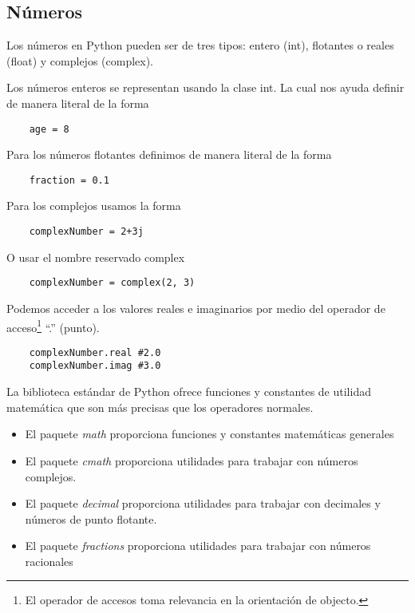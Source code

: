 \documentclass[12pt]{article}
\theoremstyle{definition}
\begin{document}
    \subsection{Números}
    Los números en Python pueden ser de tres tipos: entero (int), flotantes o reales (float) y complejos (complex).

    Los números enteros se representan usando la clase int.
    La cual nos ayuda definir de manera literal de la forma
    \begin{lstlisting}
    age = 8
    \end{lstlisting}

    Para los números flotantes definimos de manera literal de la forma
    \begin{lstlisting}
    fraction = 0.1
    \end{lstlisting}

    Para los complejos usamos la forma
    \begin{lstlisting}
    complexNumber = 2+3j
    \end{lstlisting}

    O usar el nombre reservado complex
    \begin{lstlisting}
    complexNumber = complex(2, 3)
    \end{lstlisting}
    Podemos acceder a los valores reales e imaginarios por medio del operador de acceso\footnote{El operador de accesos toma relevancia en la orientación de objecto.} ``.'' (punto).
    \begin{lstlisting}
    complexNumber.real #2.0
    complexNumber.imag #3.0
    \end{lstlisting}

    La biblioteca estándar de Python ofrece funciones y constantes de utilidad matemática que son más precisas que los operadores normales.
    \begin{itemize}
        \item El paquete \textit{math} proporciona funciones y constantes matemáticas generales
        \item El paquete \textit{cmath} proporciona utilidades para trabajar con números complejos.
        \item El paquete \textit{decimal} proporciona utilidades para trabajar con decimales y números de punto flotante.
        \item El paquete \textit{fractions} proporciona utilidades para trabajar con números racionales
    \end{itemize}
\end{document}

